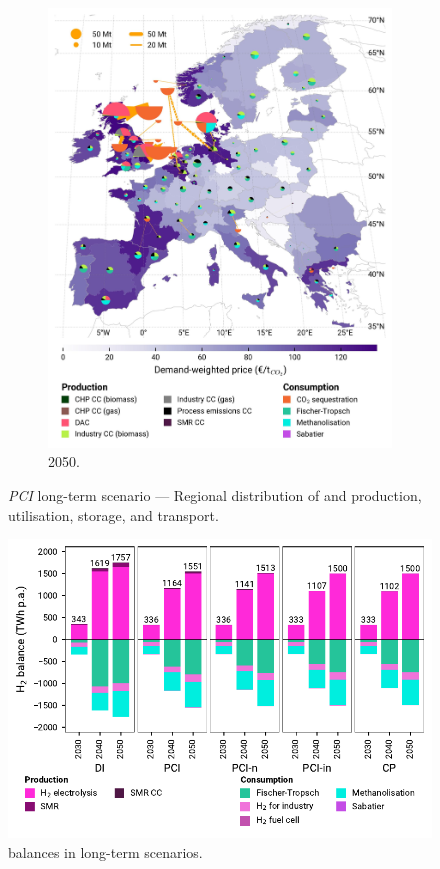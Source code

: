 \documentclass[preprint,12pt,sort&compress]{elsarticle}
\begin{document}
\begin{figure}[htbp]
\begin{subfigure}[t]{0.4\textwidth}
      \includegraphics[width=1\textwidth,trim=0cm 0cm 0cm 0cm, clip]{maps/pcipmi/base_s_adm___2050-balance_map_co2_stored} 
      \vspace{-0.7cm}
      \caption{ 2050.}
      \label{fig:PCI_lt_2050_co2}
  \end{subfigure}
  \caption{\textit{PCI} long-term scenario --- Regional distribution of  and  production, utilisation, storage, and transport.}
  \label{fig:PCI_lt_2050}
\end{figure}
\clearpage

\begin{figure}[htbp]
  \centering
  \includegraphics[width=\textwidth]{balances_overview_H2}
  \caption{ balances in long-term scenarios.}
  \label{fig:balances_overview_H2_stored}
\end{figure}
\end{document}
